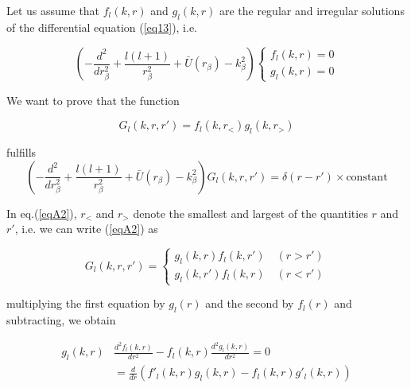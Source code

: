 Let us assume that $f_l(k,r)$ and $g_l(k,r)$ are the regular and irregular solutions of the differential equation (\ref{eq13}), i.e.

 \begin{equation}\label{eqA1}
\left( -\frac{d^2}{dr^2_\beta}+\frac{l(l+1)}{r^2_\beta}+\bar U (r_ \beta)-k_\beta^2\right)
\left \lbrace \begin{aligned}
f_l(k,r)=0\\
g_l(k,r)=0
\end{aligned}
\right.
\end{equation}

We want to prove that the function

 \begin{equation}\label{eqA2}
G_l(k,r,r')=f_l(k,r_<)g_l(k,r_>)
\end{equation}

fulfills
 \begin{equation}\label{eqA3}
\left( -\frac{d^2}{dr^2_\beta}+\frac{l(l+1)}{r^2_\beta}+\bar U (r_ \beta)-k_\beta^2\right) G_l(k,r,r')=
\delta(r-r')\times \text{constant}
\end{equation}

In eq.(\ref{eqA2}), $r_<$ and $r_>$ denote the smallest and largest of the quantities $r$ and $r'$, i.e. we can write (\ref{eqA2}) as

 \begin{equation}\label{eqA4}
G_l(k,r,r')=
\left \lbrace \begin{aligned}
g_l(k,r)f_l(k,r') \quad (r>r')\\
g_l(k,r')f_l(k,r) \quad (r<r')\end{aligned}
\right.
\end{equation}

multiplying the first equation by $g_l(r)$ and the second by $f_l(r)$ and subtracting, we obtain


 \begin{equation}\label{eqA5}
\begin{split}
g_l(k,r)& \frac{d^2 f_l(k,r)}{dr^2}-f_l(k,r) \frac{d^2 g_l(k,r)}{dr^2}=0\\
&=\frac{d}{dr}(f'_l(k,r)g_l(k,r)-f_l(k,r)g'_l(k,r))
\end{split}
\end{equation}

